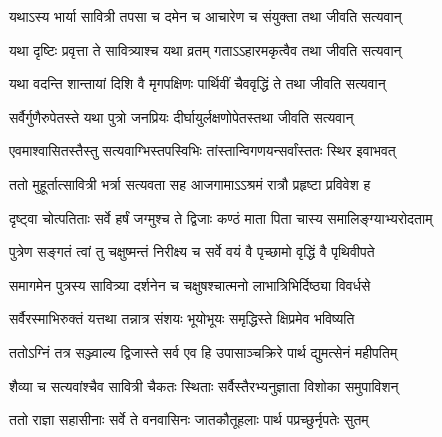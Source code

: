 \begin{center}



\twolineshloka
{यथाऽस्य भार्या सावित्री तपसा च दमेन च}
{आचारेण च संयुक्ता तथा जीवति सत्यवान्}




\twolineshloka
{यथा दृष्टिः प्रवृत्ता ते सावित्र्याश्च यथा व्रतम्}
{गताऽऽहारमकृत्वैव तथा जीवति सत्यवान्}




\twolineshloka
{यथा वदन्ति शान्तायां दिशि वै मृगपक्षिणः}
{पार्थिवीं चैववृद्धिं ते तथा जीवति सत्यवान्}




\twolineshloka
{सर्वैर्गुणैरुपेतस्ते यथा पुत्रो जनप्रियः}
{दीर्घायुर्लक्षणोपेतस्तथा जीवति सत्यवान्}




\twolineshloka
{एवमाश्वासितस्तैस्तु सत्यवाग्भिस्तपस्विभिः}
{तांस्तान्विगणयन्सर्वांस्ततः स्थिर इवाभवत्}


\twolineshloka
{ततो मुहूर्तात्सावित्री भर्त्रा सत्यवता सह}
{आजगामाऽऽश्रमं रात्रौ प्रहृष्टा प्रविवेश ह}


\twolineshloka
{दृष्ट्वा चोत्पतिताः सर्वे हर्षं जग्मुश्च ते द्विजाः}
{कण्ठं माता पिता चास्य  समालिङ्ग्याभ्यरोदताम्}




\twolineshloka
{पुत्रेण सङ्गतं त्वां तु चक्षुष्मन्तं निरीक्ष्य च}
{सर्वे वयं वै पृच्छामो वृद्धिं वै पृथिवीपते}


\twolineshloka
{समागमेन पुत्रस्य सावित्र्या दर्शनेन च}
{चक्षुषश्चात्मनो लाभात्रिभिर्दिष्ठ्या विवर्धसे}


\twolineshloka
{सर्वैरस्माभिरुक्तं यत्तथा तन्नात्र संशयः}
{भूयोभूयः समृद्धिस्ते क्षिप्रमेव भविष्यति}




\twolineshloka
{ततोऽग्निं तत्र सञ्ज्वाल्य द्विजास्ते सर्व एव हि}
{उपासाञ्चक्रिरे पार्थ द्युमत्सेनं महीपतिम्}


\twolineshloka
{शैव्या च सत्यवांश्चैव सावित्री चैकतः स्थिताः}
{सर्वैस्तैरभ्यनुज्ञाता विशोका समुपाविशन्}


\twolineshloka
{ततो राज्ञा सहासीनाः सर्वे ते वनवासिनः}
{जातकौतूहलाः पार्थ पप्रच्छुर्नृपतेः सुतम्}



\end{center}

